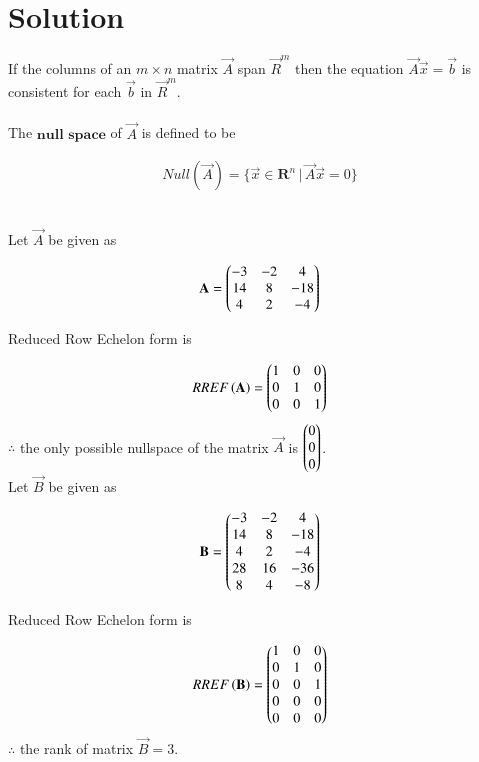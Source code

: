 \documentclass[journal,12pt,twocolumn]{IEEEtran}
\begin{document}
	\section{\textbf{Solution}}
	If the columns of an $m\times n$ matrix $\Vec{A}$ span $\vec{R}^{m}$ then the equation $\vec{A}\vec{x}=\vec{b}$ is consistent for each $\Vec{b}$ in $\vec{R}^{m}$. \\ \\
	The $\textbf{null space}$ of $\vec{A}$ is defined to be 
	
	\begin{align}\label{eq1}
		Null(\vec{A}) = \{ \vec{x} \in \mathbf{R}^{n} \, \vert \, \vec{A}\vec{x} = 0 \}
	\end{align}
	
	
	\\
	
	Let $\vec{A}$ be given as
	
	\begin{align} \label{eq2}
		\mathbf{A} = \begin{pmatrix}-3&-2&4 \\ 14&8&-18 \\ 4&2&-4\end{pmatrix}
	\end{align}
	
	Reduced Row Echelon form is
	
	\begin{align}
		RREF\left(\mathbf{A}\right) = \begin{pmatrix}1&0&0 \\ 0&1&0 \\ 0&0&1\end{pmatrix}
	\end{align}
	$\therefore$ the only possible nullspace of the matrix $\vec{A}$ is $\begin{pmatrix}0\\0\\0\end{pmatrix}$.\\
	
	Let $\vec{B}$ be given as
	
	\begin{align} \label{eq3}
		\mathbf{B} = \begin{pmatrix}-3&-2&4 \\ 14&8&-18 \\ 4&2&-4 \\ 28&16&-36 \\ 8&4&-8\end{pmatrix}
	\end{align}
	
	Reduced Row Echelon form is
	
	\begin{align}
		RREF\left(\mathbf{B}\right) = \begin{pmatrix}1&0&0 \\ 0&1&0 \\ 0&0&1 \\ 0&0&0 \\ 0&0&0\end{pmatrix}
	\end{align}
	$\therefore$ the rank of matrix $\vec{B} = 3$.
	
\end{document}
